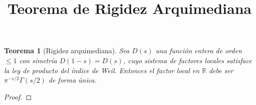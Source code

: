 \documentclass[12pt]{article}
\newtheorem{theorem}{Teorema}
\begin{document}
\title{Teorema de Rigidez Arquimediana}
\author{}
\date{}
\maketitle

\begin{theorem}[Rigidez arquimediana]
Sea $D(s)$ una función entera de orden $\le 1$ con simetría $D(1-s)=D(s)$,
cuyo sistema de factores locales satisface la ley de producto del índice de Weil.
Entonces el factor local en $\mathbb{R}$ debe ser $\pi^{-s/2}\Gamma(s/2)$ de forma única.
\end{theorem}

\begin{proof}
\end{proof}
\end{document}
